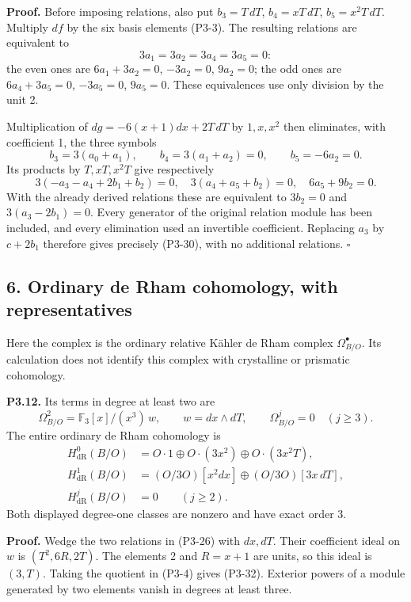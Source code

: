 \documentclass[
  10pt,
]{article}
\begin{document}
\textbf{Proof.} Before imposing relations, also put \(b_3=T\,dT\),
\(b_4=xT\,dT\), \(b_5=x^2T\,dT\). Multiply \(df\) by the six basis
elements (P3-3). The resulting relations are equivalent to \[
3a_1=3a_2=3a_4=3a_5=0:
\] the even ones are \(6a_1+3a_2=0\), \(-3a_2=0\), \(9a_2=0\); the odd
ones are \(6a_4+3a_5=0\), \(-3a_5=0\), \(9a_5=0\). These equivalences
use only division by the unit 2.

Multiplication of \(dg=-6(x+1)dx+2T\,dT\) by \(1,x,x^2\) then
eliminates, with coefficient 1, the three symbols \[
b_3=3(a_0+a_1),\qquad
b_4=3(a_1+a_2)=0,\qquad b_5=-6a_2=0.
\] Its products by \(T,xT,x^2T\) give respectively \[
3(-a_3-a_4+2b_1+b_2)=0,\quad
3(a_4+a_5+b_2)=0,\quad
6a_5+9b_2=0.
\] With the already derived relations these are equivalent to \(3b_2=0\)
and \(3(a_3-2b_1)=0\). Every generator of the original relation module
has been included, and every elimination used an invertible coefficient.
Replacing \(a_3\) by \(c+2b_1\) therefore gives precisely (P3-30), with
no additional relations. \(\square\)

\subsection{6. Ordinary de Rham cohomology, with
representatives}\label{ordinary-de-rham-cohomology-with-representatives}

Here the complex is the ordinary relative Kähler de Rham complex
\(\Omega^\bullet_{B/O}\). Its calculation does not identify this complex
with crystalline or prismatic cohomology.

\textbf{P3.12.} Its terms in degree at least two are \[
\Omega^2_{B/O}=\mathbb F_3[x]/(x^3)\,w,
\qquad w=dx\wedge dT,\qquad \Omega^j_{B/O}=0\quad(j\ge3).
\tag{P3-32}
\] The entire ordinary de Rham cohomology is \[
\begin{aligned}
H^0_{\mathrm{dR}}(B/O)&=O\cdot1\oplus O\cdot(3x^2)
\oplus O\cdot(3x^2T),\\
H^1_{\mathrm{dR}}(B/O)&=(O/3O)[x^2dx]
\oplus(O/3O)[3x\,dT],\\
H^j_{\mathrm{dR}}(B/O)&=0\qquad(j\ge2).
\end{aligned}
\tag{P3-33}
\] Both displayed degree-one classes are nonzero and have exact order 3.

\textbf{Proof.} Wedge the two relations in (P3-26) with \(dx,dT\). Their
coefficient ideal on \(w\) is \((T^2,6R,2T)\). The elements 2 and
\(R=x+1\) are units, so this ideal is \((3,T)\). Taking the quotient in
(P3-4) gives (P3-32). Exterior powers of a module generated by two
elements vanish in degrees at least three.
\end{document}
